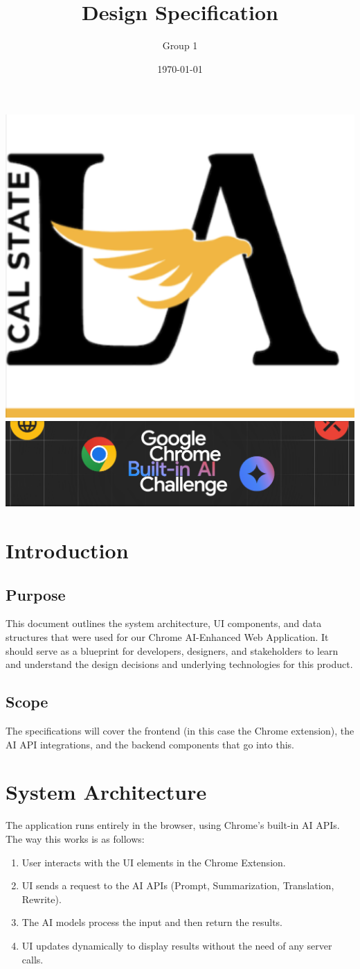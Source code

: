 \documentclass{article}
\title{Design Specification}
\author{Group 1 }
\date{\today}
\begin{document}
\maketitle  
\pagebreak

\tableofcontents
\pagebreak

\includegraphics[width=0.3\linewidth]{../logo/csula.png} 
\includegraphics[width=0.3\linewidth]{../logo/chromeai.png}

\section{Introduction}
\subsection{Purpose}
This document outlines the system architecture, UI components, and data structures that were used for our Chrome AI-Enhanced Web Application. It should serve as a blueprint for developers, designers, and stakeholders to learn and understand the design decisions and underlying technologies for this product.

\subsection{Scope}
The specifications will cover the frontend (in this case the Chrome extension), the AI API integrations, and the backend components that go into this.

\section{System Architecture}
The application runs entirely in the browser, using Chrome’s built-in AI APIs. The way this works is as follows:
\begin{enumerate}
    \item User interacts with the UI elements in the Chrome Extension.
    \item UI sends a request to the AI APIs (Prompt, Summarization, Translation, Rewrite).
    \item The AI models process the input and then return the results.
    \item UI updates dynamically to display results without the need of any server calls.
\end{enumerate}
\end{document}
